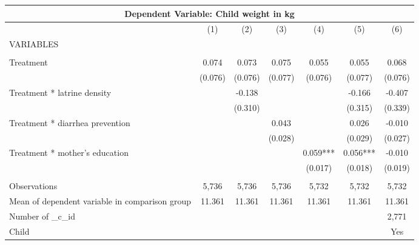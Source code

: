 \begin{tabular}{lcccccc}
\multicolumn{7}{c}{Dependent Variable: Child weight in kg} \\ \hline
 & (1) & (2) & (3) & (4) & (5) & (6) \\
VARIABLES &  &  &  &  &  &  \\ \hline
 &  &  &  &  &  &  \\
Treatment & 0.074 & 0.073 & 0.075 & 0.055 & 0.055 & 0.068 \\
 & (0.076) & (0.076) & (0.077) & (0.076) & (0.077) & (0.076) \\
Treatment * latrine density &  & -0.138 &  &  & -0.166 & -0.407 \\
 &  & (0.310) &  &  & (0.315) & (0.339) \\
Treatment * diarrhea prevention &  &  & 0.043 &  & 0.026 & -0.010 \\
 &  &  & (0.028) &  & (0.029) & (0.027) \\
Treatment * mother's education &  &  &  & 0.059*** & 0.056*** & -0.010 \\
 &  &  &  & (0.017) & (0.018) & (0.019) \\
 &  &  &  &  &  &  \\
Observations & 5,736 & 5,736 & 5,736 & 5,732 & 5,732 & 5,732 \\
Mean of dependent variable in comparison group & 11.361 & 11.361 & 11.361 & 11.361 & 11.361 & 11.361 \\
Number of \_c\_id &  &  &  &  &  & 2,771 \\
 Child &  &  &  &  &  & Yes \\ \hline
\end{tabular}
